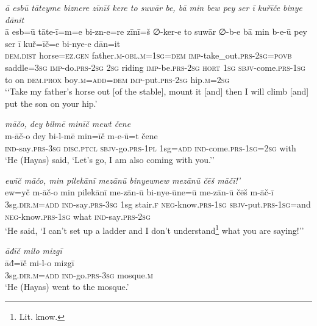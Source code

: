 \ea \label{KŠ.96}
\textit{ā esbū tāteyme biznere zīnīš kere to suwār be, bā min bew pey ser ī kuřīče binye dānit} \\ 
\gll ā esb=ū tāte-ī=m=e bi-zn-e=re zīnī=š ∅-ker-e to suwār ∅-b-e bā min b-e-ū pey ser ī kuř=īč=e bi-nye-e dān=it \\ 
 \textsc{dem.dist} horse\textsc{\textsc{=ez.gen}} father\textsc{.m}\textsc{-obl}\textsc{.m}\textsc{=\textsc{1sg}}\textsc{=dem} \textsc{imp-}take\_out\textsc{.prs}-\textsc{2sg}\textsc{=\textsc{povb}} saddle\textsc{=3sg} \textsc{imp-}do\textsc{.prs}-\textsc{2sg} \textsc{2sg} riding \textsc{imp-}be\textsc{.prs}-\textsc{2sg} \textsc{hort} \textsc{1sg} \textsc{sbjv-}come\textsc{.prs}\textsc{-\textsc{1sg}} to on \textsc{dem.prox} boy\textsc{.m}\textsc{=add}\textsc{=dem} \textsc{imp-}put\textsc{.prs}-\textsc{2sg} hip\textsc{.m}\textsc{=\textsc{2sg}} \\ 
\glt `‘Take my father’s horse out [of the stable], mount it [and] then I will climb [and] put the son on your hip.'
\z 
 
\ea \label{ŽH.11}
\textit{māčo, dey bilmē minīč mewt čene} \\ 
\gll m-āč-o dey bi-l-mē min=īč m-e-ū=t čene \\ 
 \textsc{ind-}say\textsc{.prs}\textsc{-3sg} \textsc{disc.ptcl} \textsc{sbjv-}go\textsc{.prs}\textsc{-1pl} 1sg\textsc{=add} \textsc{ind-}come\textsc{.prs}\textsc{-1sg}\textsc{=\textsc{2sg}} with \\ 
\glt `He (Hayas) said, ‘Let’s go, I am also coming with you.’'
\z 
 
\ea \label{ŽH.13}
\textit{ewīč māčo, min pilekānī mezānū binyewnew mezānū čēš māčī!’} \\ 
\gll ew=yč m-āč-o min pilekānī me-zān-ū bi-nye-ūne=ū me-zān-ū čēš m-āč-ī \\ 
 3sg\textsc{.dir}\textsc{.m}\textsc{=add} \textsc{ind-}say\textsc{.prs}\textsc{-3sg} 1sg stair\textsc{\textsc{.f}} \textsc{neg-}know\textsc{.prs}\textsc{-1sg} \textsc{sbjv-}put\textsc{.prs}\textsc{-1sg}=and \textsc{neg-}know\textsc{.prs}\textsc{-1sg} what \textsc{ind-}say\textsc{.prs}-\textsc{2sg} \\ 
\glt `He said, ‘I can’t set up a ladder and I don’t understand\footnote{Lit. know.}  what you are saying!’'
\z 
 
\ea \label{ŽH.19}
\textit{āđīč milo mizgī} \\ 
\gll āđ=īč mi-l-o mizgī \\ 
 3sg\textsc{.dir}\textsc{.m}\textsc{=add} \textsc{ind-}go\textsc{.prs}\textsc{-3sg} mosque\textsc{.m} \\ 
\glt `He (Hayas) went to the mosque.'
\z 
 
